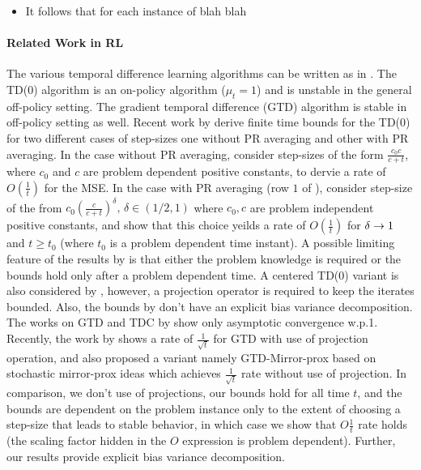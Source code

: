 \begin{itemize}
\item It follows that for each instance of blah blah
\end{itemize}

\paragraph{Related Work in RL} The various temporal difference learning algorithms can be written as in . The TD(0) algorithm is an on-policy algorithm ($\mu_t=1$) and is unstable in the general {off-policy} setting. The gradient temporal difference (GTD) algorithm \cite{gtd,gtd2,gtdmp} is stable in off-policy setting as well. Recent work by \cite{korda-prashanth} derive finite time bounds for the TD(0) for two different cases of step-sizes one without PR averaging and other with PR averaging. In the case without PR averaging, \cite{korda-prashanth} consider step-sizes of the form $\frac{c_0c}{c+t}$, where $c_0$ and $c$ are problem dependent positive constants, to dervie a rate of $O(\frac{1}{t})$ for the MSE.  In the case with PR averaging (row $1$ of ), \cite{korda-prashanth} consider step-size of the from $c_0\left(\frac{c}{c+t}\right)^\delta,\,\delta \in (1/2,1)$ where $c_0, c$ are problem independent positive constants, and show that this choice yeilds a rate of $O(\frac{1}{t})$ for $\delta \rightarrow 1$ and $t\geq t_0$ (where $t_0$ is a problem dependent time instant). A possible limiting feature of the results by \cite{korda-prashanth} is that either the problem knowledge is required or the bounds hold only after a problem dependent time. A centered TD(0) variant is also considered by \cite{korda-prashanth}, however, a projection operator is required to keep the iterates bounded. Also, the bounds by \cite{korda-prashanth} don't have an explicit bias variance decomposition. The works on GTD and TDC by \cite{gtd,gtd2} show only asymptotic convergence w.p.1. Recently, the work by \cite{gtdmp} shows a rate of $\frac{1}{\sqrt{t}}$ for GTD with use of projection operation, and also proposed a variant namely GTD-Mirror-prox based on stochastic mirror-prox ideas which achieves $\frac{1}{\sqrt{t}}$ rate without use of projection. In comparison, we don't use of projections, our bounds hold for all time $t$, and the bounds are dependent on the problem instance only to the extent of choosing a step-size that leads to stable behavior, in which case we show that $O\frac{1}{t}$ rate holds (the scaling factor hidden in the $O$ expression is problem dependent). Further, our results provide explicit bias variance decomposition.
